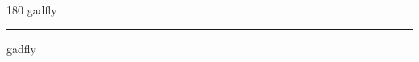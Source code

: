 
\begin{frame}
\begin{center}
\begin{turn}{180}
{\fontsize{2.5cm}{1em}\selectfont gadfly}
\end{turn}
\vspace{1em}\par  
\hrule
\vspace{1em}\par  
{\fontsize{2.5cm}{1em}\selectfont gadfly}
\end{center}
\end{frame}
